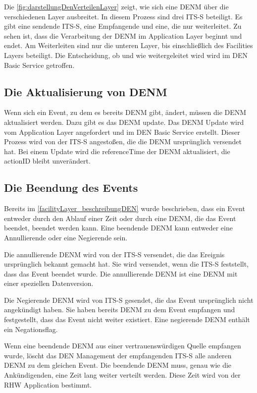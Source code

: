 Die \autoref{fig:darstellungDenVerteilenLayer} zeigt, wie sich eine \ac{DENM} über die verschiedenen Layer ausbreitet. In diesem Prozess sind drei \ac{ITS-S} beteiligt. Es gibt eine sendende \ac{ITS-S}, eine Empfangende und eine, die nur weiterleitet. Zu sehen ist, dass die Verarbeitung der \ac{DENM} im Application Layer beginnt und endet. Am Weiterleiten sind nur die unteren Layer, bis einschließlich des Facilities Layers beteiligt. Die Entscheidung, ob und wie weitergeleitet wird wird im \ac{DEN} Basic Service getroffen. 

\subsection{Die Aktualisierung von DENM}
Wenn sich ein Event, zu dem es bereits \ac{DENM} gibt, ändert, müssen die \ac{DENM} aktualisiert werden. Dazu gibt es das \ac{DENM} update. Das \ac{DENM} Update wird vom Application Layer angefordert und im \ac{DEN} Basic Service erstellt. Dieser Prozess wird von der \ac{ITS-S} angestoßen, die die \ac{DENM} ursprünglich versendet hat. Bei einem Update wird die referenceTime der \ac{DENM} aktualisiert, die actionID bleibt unverändert. 

 
\subsection{Die Beendung des Events}
Bereits im \autoref{facilityLayer_beschreibungDEN} wurde beschrieben, dass ein Event entweder durch den Ablauf einer Zeit oder durch eine \ac{DENM}, die das Event beendet, beendet werden kann. Eine beendende \ac{DENM} kann entweder eine Annullierende oder eine Negierende sein. 

Die annullierende \ac{DENM} wird von der \ac{ITS-S} versendet, die das Ereignis ursprünglich bekannt gemacht hat. Sie wird versendet, wenn die \ac{ITS-S} feststellt, dass das Event beendet wurde.  Die annullierende \ac{DENM} ist eine \ac{DENM} mit einer speziellen Datenversion.

Die Negierende \ac{DENM} wird von \ac{ITS-S} gesendet, die das Event ursprünglich nicht angekündigt haben. Sie haben bereits \ac{DENM} zu dem Event empfangen und festgestellt, dass das Event nicht weiter existiert. Eine negierende \ac{DENM} enthält ein Negationsflag. 

Wenn eine beendende \ac{DENM} aus einer vertrauenswürdigen Quelle empfangen wurde, löscht das \ac{DEN} Management der empfangenden \ac{ITS-S} alle anderen \ac{DENM} zu dem gleichen Event. Die beendende \ac{DENM} muss, genau wie die Ankündigenden, eine Zeit lang weiter verteilt werden. Diese Zeit wird von der \ac{RHW} Application bestimmt.

